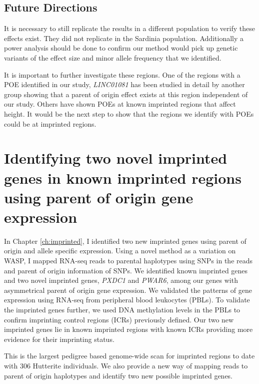  \subsection{Future Directions}
It is necessary to still replicate the results in a different population to verify these effects exist. They did not replicate in the Sardinia population. Additionally a power analysis should be done to confirm our method would pick up genetic variants of the effect size and minor allele frequency that we identified.

It is important to further investigate these regions. One of the regions with a POE identified in our study, \emph{LINC01081} has been studied in detail by another group showing that a parent of origin effect exists at this region independent of our study\cite{Szafranski:2016fz}. Others have shown POEs at known imprinted regions that affect height\cite{Benonisdottir:2016dz,Zoledziewska:2015do}. It would be the next step to show that the regions we identify with POEs could be at imprinted regions.
 
\section{Identifying two novel imprinted genes in known imprinted regions using parent of origin gene expression}

 In Chapter \ref{ch:imprinted}, I identified two new imprinted genes using parent of origin and allele specific expression. Using a novel method as a variation on WASP\cite{vandeGeijn:2015hi}, I mapped RNA-seq reads to parental haplotypes using SNPs in the reads and parent of origin information of SNPs. We identified known imprinted genes and two novel imprinted genes, \emph{PXDC1} and \emph{PWAR6}, among our genes with asymmetrical parent of origin gene expression. We validated the patterns of gene expression using RNA-seq from peripheral blood leukocytes (PBLs). To validate the imprinted genes further, we used DNA methylation levels in the PBLs to confirm imprinting control regions (ICRs) previously defined\cite{Joshi:2016bb,Court:2014kc}. Our two new imprinted genes lie in known imprinted regions with known ICRs providing more evidence for their imprinting status.
 
This is the largest pedigree based genome-wide scan for imprinted regions to date with 306 Hutterite individuals. We also provide a new way of mapping reads to parent of origin haplotypes and identify two new possible imprinted genes.

